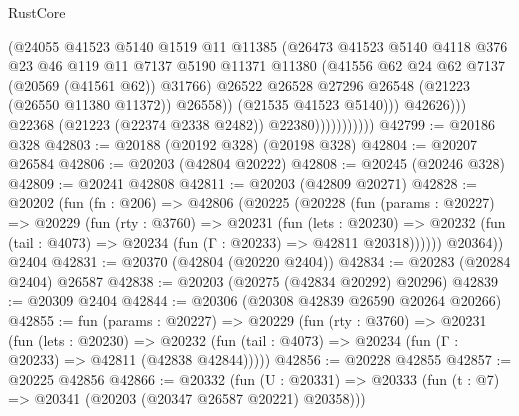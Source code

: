 \begin{lexlean}{RustCore}
\begin{coremodule}
                                    (@24055
                                      @41523
                                      @5140
                                      @1519
                                      @11
                                      @11385
                                      (@26473
                                        @41523
                                        @5140
                                        @4118
                                        @376
                                        @23
                                        @46
                                        @119
                                        @11
                                        @7137
                                        @5190
                                        @11371
                                        @11380
                                        (@41556 @62 @24 @62 @7137 (@20569 (@41561 @62)) @31766)
                                        @26522
                                        @26528
                                        @27296
                                        @26548
                                        (@21223 (@26550 @11380 @11372))
                                        @26558))
                                    (@21535 @41523 @5140)))
                                @42626)))
                          @22368
                          (@21223 (@22374 @2338 @2482))
                          @22380)))))))))))
@42799 := @20186 @328
@42803 := @20188 (@20192 @328) (@20198 @328)
@42804 := @20207 @26584
@42806 := @20203 (@42804 @20222)
@42808 := @20245 (@20246 @328)
@42809 := @20241 @42808
@42811 := @20203 (@42809 @20271)
@42828 := @20202
    (fun (fn : @206) =>
    @42806
      (@20225
        (@20228
          (fun (params : @20227) =>
          @20229
            (fun (rty : @3760) =>
            @20231
              (fun (lets : @20230) =>
              @20232 (fun (tail : @4073) => @20234 (fun (Γ : @20233) => @42811 @20318))))))
        @20364))
    @2404
@42831 := @20370 (@42804 (@20220 @2404))
@42834 := @20283 (@20284 @2404) @26587
@42838 := @20203 (@20275 (@42834 @20292) @20296)
@42839 := @20309 @2404
@42844 := @20306 (@20308 @42839 @26590 @20264 @20266)
@42855 := fun (params : @20227) =>
  @20229
    (fun (rty : @3760) =>
    @20231
      (fun (lets : @20230) =>
      @20232 (fun (tail : @4073) => @20234 (fun (Γ : @20233) => @42811 (@42838 @42844)))))
@42856 := @20228 @42855
@42857 := @20225 @42856
@42866 := @20332
    (fun (U : @20331) => @20333 (fun (t : @7) => @20341 (@20203 (@20347 @26587 @20221) @20358)))

\end{coremodule}
\end{lexlean}
